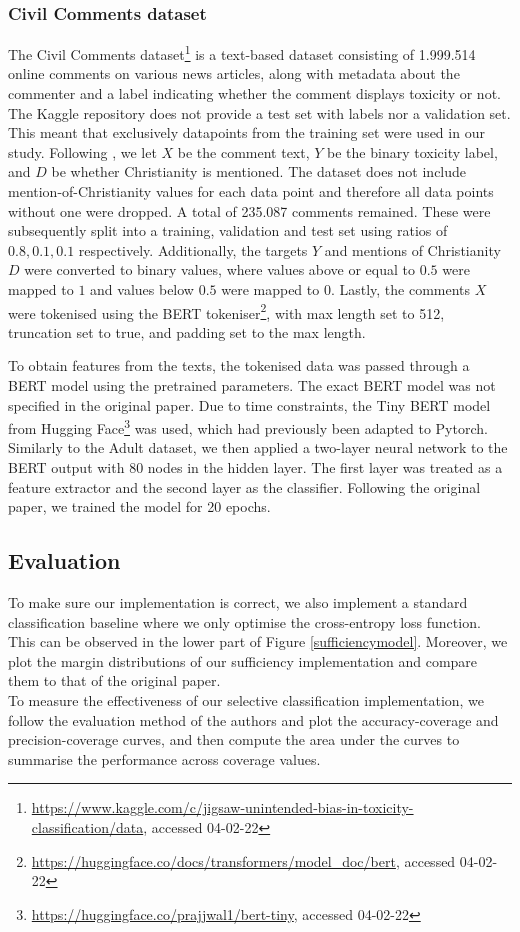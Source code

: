 \subsubsection{Civil Comments dataset}
The Civil Comments dataset\footnote{\url{https://www.kaggle.com/c/jigsaw-unintended-bias-in-toxicity-classification/data}, accessed 04-02-22} \citep{borkan2019nuanced} is a text-based dataset consisting of 1.999.514 online comments on various news articles, along with metadata about the commenter and a label indicating whether the comment displays toxicity or not. The Kaggle repository does not provide a test set with labels nor a validation set. This meant that exclusively datapoints from the training set were used in our study. Following \citet{lee2021fair}, we let $X$ be the comment text, $Y$ be the binary toxicity label, and $D$ be whether Christianity is mentioned. The dataset does not include mention-of-Christianity values for each data point and therefore all data points without one were dropped. A total of 235.087 comments remained. These were subsequently split into a training, validation and test set using ratios of $0.8, 0.1, 0.1$ respectively. Additionally, the targets $Y$ and mentions of Christianity $D$ were converted to binary values, where values above or equal to $0.5$ were mapped to $1$ and values below $0.5$ were mapped to $0$. Lastly, the comments $X$ were tokenised using the BERT tokeniser\footnote{\url{https://huggingface.co/docs/transformers/model_doc/bert}, accessed 04-02-22}, with max length set to 512, truncation set to true, and padding set to the max length.

To obtain features from the texts, the tokenised data was passed through a BERT model \citep{devlin2018bert} using the pretrained parameters. The exact BERT model was not specified in the original paper. Due to time constraints, the Tiny BERT model from Hugging Face\footnote{\url{https://huggingface.co/prajjwal1/bert-tiny}, accessed 04-02-22} \citep{DBLP:journals/corr/abs-1908-08962, bhargava2021generalization} was used, which had previously been adapted to Pytorch. Similarly to the Adult dataset, we then applied a two-layer neural network to the BERT output with 80 nodes in the hidden layer. The first layer was treated as a feature extractor and the second layer as the classifier. Following the original paper, we trained the model for 20 epochs.

\subsection{Evaluation}
To make sure our implementation is correct, we also implement a standard classification baseline where we only optimise the cross-entropy loss function. This can be observed in the lower part of Figure \ref{sufficiencymodel}. Moreover, we plot the margin distributions of our sufficiency implementation and compare them to that of the original paper. \\
To measure the effectiveness of our selective classification implementation, we follow the evaluation method of the authors and plot the accuracy-coverage and precision-coverage curves, and then compute the area under the curves to summarise the performance across coverage values.

